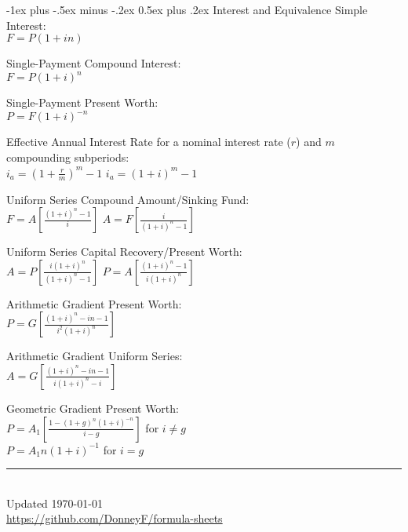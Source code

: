 \documentclass[12pt,landscape]{article}
\makeatletter
\renewcommand{\section}{\@startsection{section}{1}{0mm}%
                                {-1ex plus -.5ex minus -.2ex}%
                                {0.5ex plus .2ex}%
                                {\normalfont\normalsize\bfseries}}
\newcommand{\tab}{\hspace{.02\textwidth}}
\newcommand{\ds}{\displaystyle}
\makeatother
\begin{document}
\begin{multicols*}{3}
\section{Interest and Equivalence}
Simple Interest:\\
\tab $F = P(1 + in)$

Single-Payment Compound Interest:\\
\tab $F = P(1 + i)^n$

Single-Payment Present Worth:\\
\tab $P = F(1 + i)^{-n}$

Effective Annual Interest Rate for a nominal interest rate ($r$) and $m$ compounding subperiods:\\
\tab $\ds i_a = \left(1+ \frac{r}{m}\right)^m -1$ \qquad $i_a = (1 + i)^m-1$

Uniform Series Compound Amount/Sinking Fund:\\
\tab $\ds F = A\left[\frac{(1+i)^n-1}{i}\right]$ \qquad $\ds A = F\left[\frac{i}{(1+i)^n-1}\right]$

Uniform Series Capital Recovery/Present Worth:\\
\tab $\ds A = P\left[\frac{i(1+i)^n}{(1+i)^n-1}\right]$ \qquad $\ds P = A\left[\frac{(1+i)^n-1}{i(1+i)^n}\right]$

Arithmetic Gradient Present Worth:\\
\tab $\ds P = G\left[\frac{(1+i)^n-in-1}{i^2(1+i)^n}\right]$

Arithmetic Gradient Uniform Series:\\
\tab $\ds A = G\left[\frac{(1+i)^n-in-1}{i(1+i)^n-i}\right]$

Geometric Gradient Present Worth:\\
\tab $\ds P = A_1\left[\frac{1-(1+g)^n(1+i)^{-n}}{i-g}\right]$ \quad for $i\neq g$\\
\tab $\ds P = A_1n(1+i)^{-1}$ \hspace{2.27cm} for $i = g$


\rule{0.3\linewidth}{0.25pt}
\scriptsize\\
Updated \today\\
\href{https://github.com/DonneyF/formula-sheets}{https://github.com/DonneyF/formula-sheets}
\end{multicols*}
\end{document}
